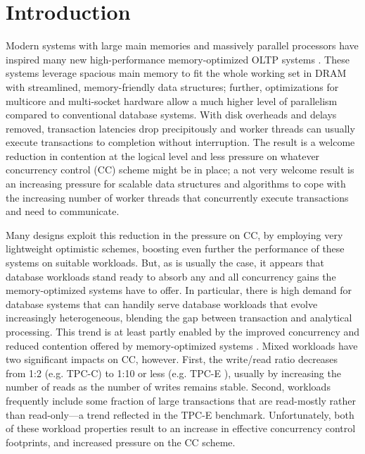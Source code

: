 
\section{Introduction}

Modern systems with large main memories and massively parallel processors have inspired many new high-performance memory-optimized OLTP systems \cite{Kallman+08,PandisJHA10,KemperN11,LarsonBDFPZ11,TuZKLM13}. These systems leverage spacious main memory to fit the whole working set in DRAM with streamlined, memory-friendly data structures; further, optimizations for multicore and multi-socket hardware allow a much higher level of parallelism compared to conventional database systems. With disk overheads and delays removed, transaction latencies drop precipitously and worker threads can usually execute transactions to completion without interruption. The result is a welcome reduction in contention at the logical level and less pressure on whatever concurrency control (CC) scheme might be in place; a not very welcome result is an increasing pressure for scalable data structures and algorithms to cope with the increasing number of worker threads that concurrently execute transactions and need to communicate.



Many designs exploit this reduction in the pressure on CC, by employing very lightweight optimistic schemes, boosting even further the performance of these systems on suitable workloads.
But, as is usually the case, it appears that database workloads stand ready to absorb any and all concurrency gains the memory-optimized systems have to offer. In particular, there is high demand for database systems that can handily serve database workloads that evolve increasingly heterogeneous, blending the gap between transaction and analytical processing. This trend is at least partly enabled by the improved concurrency and reduced contention offered by memory-optimized systems \cite{Farber+12}. Mixed workloads have two significant impacts on CC, however. First, the write/read ratio decreases from 1:2 (e.g. TPC-C) to 1:10 or less (e.g. TPC-E \cite{Chen+10,TozunPKJA13}), usually by increasing the number of reads as the number of writes remains stable. 
Second, workloads frequently include some fraction of large transactions that are read-mostly rather than read-only---a trend reflected in the TPC-E benchmark. Unfortunately, both of these workload properties result to an increase in effective concurrency control footprints, and increased pressure on the CC scheme. 

